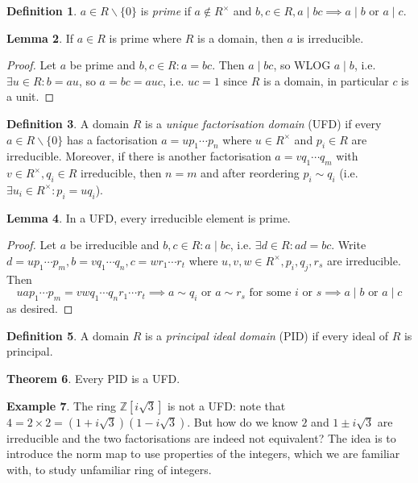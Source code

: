 \documentclass{article}
\newcommand{\Z}{\mathbb{Z}}
\theoremstyle{definition}
\newtheorem{defn}{Definition}[subsection]
\newtheorem{thm}[defn]{Theorem}
\newtheorem{lemma}[defn]{Lemma}
\newtheorem{example}[defn]{Example}
\begin{document}
\begin{defn}
$a\in R\backslash\{0\}$ is \textit{prime} if $a\notin R^\times$ and $b,c\in R,a\mid bc\implies a\mid b$ or $a\mid c$.
\end{defn}

\begin{lemma}
\label{lemma:primeisirred}
If $a\in R$ is prime where $R$ is a domain, then $a$ is irreducible.
\end{lemma}
\begin{proof}
Let $a$ be prime and $b,c\in R:a=bc$. Then $a\mid bc$, so WLOG $a\mid b$, i.e. $\exists u\in R:b=au$, so $a=bc=auc$, i.e. $uc=1$ since $R$ is a domain, in particular $c$ is a unit.
\end{proof}

\begin{defn}
A domain $R$ is a \textit{unique factorisation domain} (UFD) if every $a\in R\backslash\{0\}$ has a factorisation $a=up_1\cdots p_n$ where $u\in R^\times$ and $p_i\in R$ are irreducible. Moreover, if there is another factorisation $a=vq_1\cdots q_m$ with $v\in R^\times,q_i\in R$ irreducible, then $n=m$ and after reordering $p_i\sim q_i$ (i.e. $\exists u_i\in R^\times:p_i=uq_i$).
\end{defn}

\begin{lemma}
In a UFD, every irreducible element is prime.
\end{lemma}
\begin{proof}
Let $a$ be irreducible and $b,c\in R:a\mid bc$, i.e. $\exists d\in R:ad=bc$. Write $d=up_1\cdots p_m,b=vq_1\cdots q_n,c=wr_1\cdots r_t$ where $u,v,w\in R^\times,p_i,q_j,r_s$ are irreducible. Then
\[
uap_1\cdots p_m=vwq_1\cdots q_nr_1\cdots r_t\implies a\sim q_i\text{ or }a\sim r_s\text{ for some }i\text{ or }s\implies a\mid b\text{ or }a\mid c
\]
as desired.
\end{proof}

\begin{defn}
A domain $R$ is a \textit{principal ideal domain} (PID) if every ideal of $R$ is principal.
\end{defn}

\begin{thm}
\label{thm:PIDisUFD}
Every PID is a UFD.
\end{thm}

\begin{example}
The ring $\Z\left[i\sqrt{3}\right]$ is not a UFD: note that $4=2\times 2=\left(1+i\sqrt 3\right)\left(1-i\sqrt 3\right)$. But how do we know $2$ and $1\pm i\sqrt 3$ are irreducible and the two factorisations are indeed not equivalent? The idea is to introduce the norm map to use properties of the integers, which we are familiar with, to study unfamiliar ring of integers.
\end{example}
\end{document}
